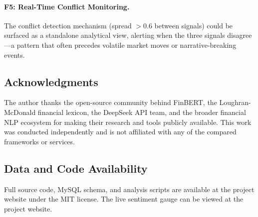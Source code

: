 \paragraph{F5: Real-Time Conflict Monitoring.} The conflict detection mechanism (spread $> 0.6$ between signals) could be surfaced as a standalone analytical view, alerting when the three signals disagree---a pattern that often precedes volatile market moves or narrative-breaking events.

\subsection*{Acknowledgments}

The author thanks the open-source community behind FinBERT, the Loughran-McDonald financial lexicon, the DeepSeek API team, and the broader financial NLP ecosystem for making their research and tools publicly available. This work was conducted independently and is not affiliated with any of the compared frameworks or services.

\subsection*{Data and Code Availability}

Full source code, MySQL schema, and analysis scripts are available at the project website under the MIT license. The live sentiment gauge can be viewed at the project website.
